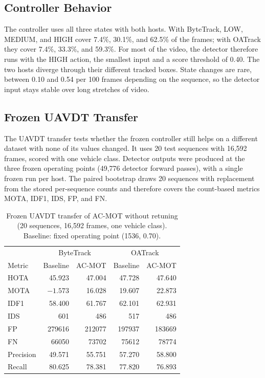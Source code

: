 \subsection{Controller Behavior}\label{sec:res-ac-behavior}
The controller uses all three states with both hosts. With ByteTrack, LOW, MEDIUM, and HIGH cover 7.4\%, 30.1\%, and 62.5\% of the frames; with OATrack they cover 7.4\%, 33.3\%, and 59.3\%. For most of the video, the detector therefore runs with the HIGH action, the smallest input and a score threshold of 0.40. The two hosts diverge through their different tracked boxes. State changes are rare, between 0.10 and 0.54 per 100 frames depending on the sequence, so the detector input stays stable over long stretches of video.

\subsection{Frozen UAVDT Transfer}\label{sec:res-ac-uavdt}
The UAVDT transfer tests whether the frozen controller still helps on a different dataset with none of its values changed. It uses 20 test sequences with 16,592 frames, scored with one vehicle class. Detector outputs were produced at the three frozen operating points (49,776 detector forward passes), with a single frozen run per host. The paired bootstrap draws 20 sequences with replacement from the stored per-sequence counts and therefore covers the count-based metrics MOTA, IDF1, IDS, FP, and FN.

\begin{table}[tbp]
\centering
\caption{Frozen UAVDT transfer of AC-MOT without retuning (20 sequences, 16,592 frames, one vehicle class). Baseline: fixed operating point (1536, 0.70).}
\label{tab:res-ac-uavdt}
\begin{tabular}{lrrrr}
\toprule
 & \multicolumn{2}{c}{ByteTrack} & \multicolumn{2}{c}{OATrack}\\
Metric & Baseline & AC-MOT & Baseline & AC-MOT\\
\midrule
HOTA & 45.923 & 47.004 & 47.728 & 47.640\\
MOTA & $-1.573$ & 16.028 & 19.607 & 22.873\\
IDF1 & 58.400 & 61.767 & 62.101 & 62.931\\
IDS & 601 & 486 & 517 & 486\\
FP & 279616 & 212077 & 197937 & 183669\\
FN & 66050 & 73702 & 75612 & 78774\\
Precision & 49.571 & 55.751 & 57.270 & 58.800\\
Recall & 80.625 & 78.381 & 77.820 & 76.893\\
\bottomrule
\end{tabular}
\end{table}


